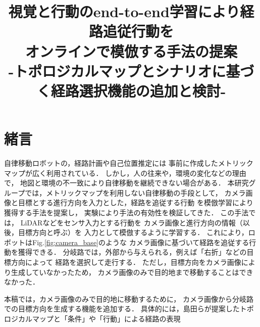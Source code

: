 \documentclass{sice-si}
\title{視覚と行動のend-to-end学習により経路追従行動を\\
オンラインで模倣する手法の提案\\
-トポロジカルマップとシナリオに基づく経路選択機能の追加と検討-\\} %
\begin{document}

\maketitle

\section{緒言}
自律移動ロボットの，経路計画や自己位置推定には
事前に作成したメトリックマップが広く利用されている．
しかし，人の往来や，環境の変化などの理由で，
地図と環境の不一致により自律移動を継続できない場合がある．
本研究グループでは，メトリックマップを利用しない自律移動の手段として，
カメラ画像と目標とする進行方向を入力とした，経路を追従する行動
を模倣学習により獲得する手法を提案し，
実験により手法の有効性を検証してきた\cite{haruyama2022}\cite{fujiwara2023}．
この手法では，
LiDARなどをセンサ入力とする行動を
カメラ画像と進行方向の情報（以後，目標方向と呼ぶ）を
入力として模倣するように学習する．
これにより，ロボットはFig.\ref{fig:camera_base}のような
カメラ画像に基づいて経路を追従する行動を獲得できる．
分岐路では，外部から与えられる，例えば「右折」などの目標方向によって
経路を選択して走行する．
ただし，目標方向をカメラ画像により生成していなかったため，
カメラ画像のみで目的地まで移動することはできなかった．
\par
本稿では，カメラ画像のみで目的地に移動するために，
カメラ画像から分岐路での目標方向を生成する機能を追加する．
具体的には，島田ら\cite{shimada2020}が提案したトポロジカルマップと「条件」や「行動」による経路の表現
\end{document}

